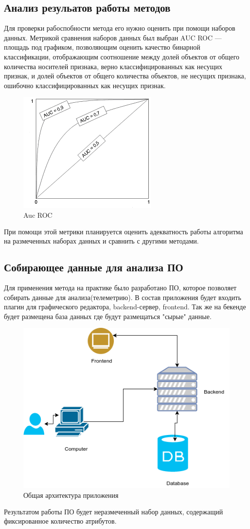 \subsection{Анализ резульатов работы методов}
Для проверки рабоспобности метода его нужно оценить при помощи наборов данных. Метрикой сравнения наборов данных был выбран AUC ROC — площадь под графиком, позволяющим оценить качество бинарной классификации, отображающим соотношение между долей объектов от общего количества носителей признака, верно классифицированных как несущих признак, и долей объектов от общего количества объектов, не несущих признака, ошибочно классифицированных как несущих признак. 
\begin{figure}
	\centering
	\includegraphics[width=.5\textwidth]{img/aucROc.png}
	\caption{Auc ROC}\label{cha:design}
	\label{fig06}
\end{figure}
При помощи этой метрики планируется оценить адекватность работы алгоритма на размеченных наборах данных и  сравнить  с другими методами.
\subsection{Собирающее данные для анализа ПО}
Для применения метода на практике было разработано ПО, которое позволяет собирать данные для анализа(телеметрию). В состав приложения будет входить плагин для графического редактора, backend-сервер, frontend. Так же на бекенде будет размещена база данных где будут размещаться "сырые" данные. 
\begin{figure}
	\centering
	\includegraphics[width=.5\textwidth]{img/diagram1.png}
	\caption{Общая архитектура приложения}\label{cha:design}
	\label{fig07}
\end{figure}
Результатом работы ПО будет неразмеченный набор данных, содержащий фиксированное количество атрибутов.
